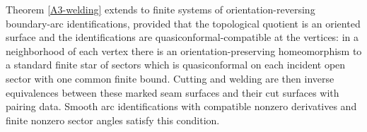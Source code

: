 \begin{proposition}\label{A3-graph}
Theorem \ref{A3-welding} extends to finite systems of orientation-reversing boundary-arc identifications, provided that the topological quotient is an oriented surface and the identifications are quasiconformal-compatible at the vertices: in a neighborhood of each vertex there is an orientation-preserving homeomorphism to a standard finite star of sectors which is quasiconformal on each incident open sector with one common finite bound. Cutting and welding are then inverse equivalences between these marked seam surfaces and their cut surfaces with pairing data. Smooth arc identifications with compatible nonzero derivatives and finite nonzero sector angles satisfy this condition.
\end{proposition}
